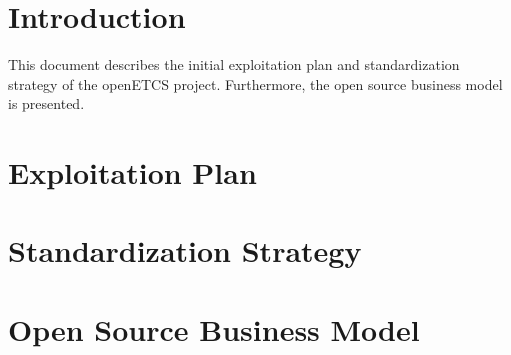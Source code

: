 \documentclass{template/openetcs_article}
\begin{document}
\tableofcontents















\section{Introduction}

This document describes the initial exploitation plan and standardization strategy of the openETCS project. Furthermore, the open source business model is presented.

\section{Exploitation Plan}

\section{Standardization Strategy}

\section{Open Source Business Model}

\end{document}
